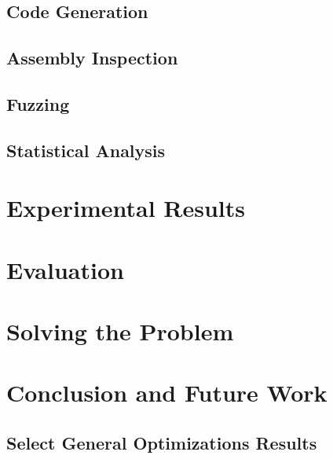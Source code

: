 \documentclass[10pt]{article}
\begin{document}
\subsection{Code Generation}

\subsection{Assembly Inspection}

\subsection{Fuzzing}

\subsection{Statistical Analysis}


\section{Experimental Results}


\section{Evaluation}


\section{Solving the Problem}


\section{Conclusion and Future Work}


\pagebreak




\pagebreak
\begin{appendices}



\section{Select General Optimizations Results}
\label{appendix:general-optimizations-results}


\end{appendices}
\end{document}
